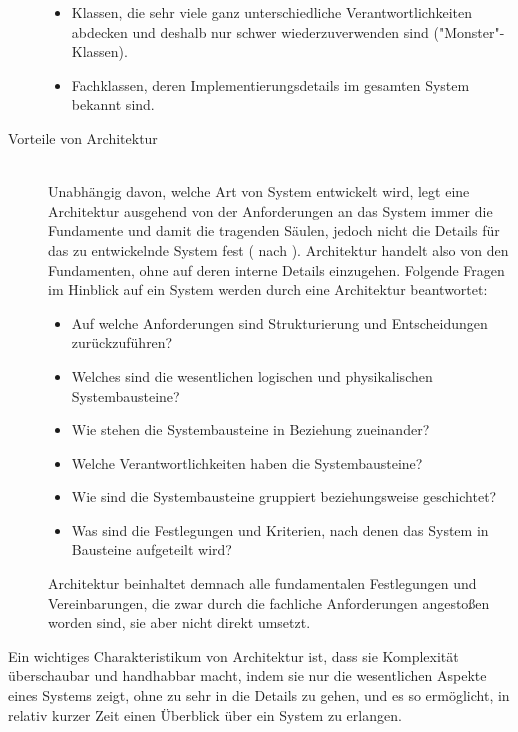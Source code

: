 \begin{description}
\begin{itemize}
\item Klassen, die sehr viele ganz unterschiedliche Verantwortlichkeiten abdecken und deshalb nur schwer wiederzuverwenden sind ("Monster"-Klassen).
\item Fachklassen, deren Implementierungsdetails im gesamten System bekannt sind.
\end{itemize}
\item[Vorteile von Architektur] \hfill \\
Unabhängig davon, welche Art von System entwickelt wird, legt eine Architektur ausgehend von der Anforderungen an das System immer die Fundamente und damit die tragenden Säulen, jedoch nicht die Details für das zu entwickelnde System fest (\citereset \autocite{Buschmann.1996} nach \citereset \autocite{Vogel.2009}). Architektur handelt also von den Fundamenten, ohne auf deren interne Details einzugehen. Folgende Fragen im Hinblick auf ein System werden durch eine Architektur beantwortet:
\begin{itemize}
\item Auf welche Anforderungen sind Strukturierung und Entscheidungen zurückzuführen?
\item Welches sind die wesentlichen logischen und physikalischen Systembausteine?
\item Wie stehen die Systembausteine in Beziehung zueinander?
\item Welche Verantwortlichkeiten haben die Systembausteine?
\item Wie sind die Systembausteine gruppiert beziehungsweise geschichtet?
\item Was sind die Festlegungen und Kriterien, nach denen das System in Bausteine aufgeteilt wird?
\end{itemize}
Architektur beinhaltet demnach alle fundamentalen Festlegungen und Vereinbarungen, die zwar durch die fachliche Anforderungen angestoßen worden sind, sie aber nicht direkt umsetzt.
\end{description}
Ein wichtiges Charakteristikum von Architektur ist, dass sie Komplexität überschaubar und handhabbar macht, indem sie nur die wesentlichen Aspekte eines Systems zeigt, ohne zu sehr in die Details zu gehen, und es so ermöglicht, in relativ kurzer Zeit einen Überblick über ein System zu erlangen.


